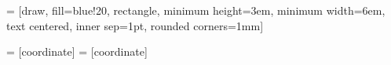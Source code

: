\usepackage{tikz}
\usetikzlibrary{shapes}
\usetikzlibrary{arrows}
\usetikzlibrary{fit}
\usetikzlibrary{backgrounds}

 = [draw, fill=blue!20, rectangle,
    minimum height=3em, minimum width=6em, text centered, inner sep=1pt, rounded corners=1mm]

 = [coordinate]
 = [coordinate]
